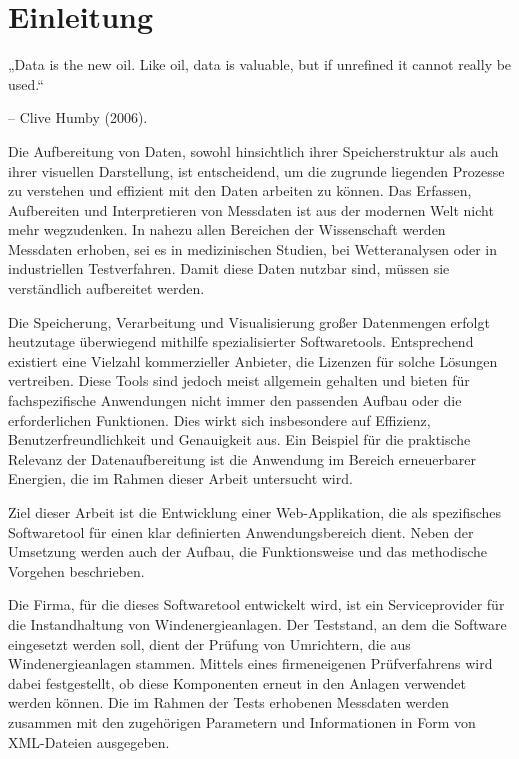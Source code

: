 


\newpage
\section{Einleitung}
\label{sec:einleitung}






„Data is the new oil. Like oil, data is valuable, but if
unrefined it cannot really be used.“

– Clive Humby (2006).

Die Aufbereitung von Daten, sowohl hinsichtlich ihrer
Speicherstruktur als auch ihrer visuellen Darstellung, ist entscheidend, um die
zugrunde liegenden Prozesse zu verstehen und effizient mit den Daten arbeiten
zu können. Das Erfassen, Aufbereiten und Interpretieren von Messdaten ist aus
der modernen Welt nicht mehr wegzudenken. In nahezu allen Bereichen der
Wissenschaft werden Messdaten erhoben, sei es in medizinischen Studien, bei
Wetteranalysen oder in industriellen Testverfahren. Damit diese Daten nutzbar
sind, müssen sie verständlich aufbereitet werden.



Die Speicherung, Verarbeitung und Visualisierung großer
Datenmengen erfolgt heutzutage überwiegend mithilfe spezialisierter
Softwaretools. Entsprechend existiert eine Vielzahl kommerzieller Anbieter, die
Lizenzen für solche Lösungen vertreiben. Diese Tools sind jedoch meist
allgemein gehalten und bieten für fachspezifische Anwendungen nicht immer den
passenden Aufbau oder die erforderlichen Funktionen. Dies wirkt sich
insbesondere auf Effizienz, Benutzerfreundlichkeit und Genauigkeit aus. Ein
Beispiel für die praktische Relevanz der Datenaufbereitung ist die Anwendung im
Bereich erneuerbarer Energien, die im Rahmen dieser Arbeit untersucht wird.



Ziel dieser Arbeit ist die Entwicklung einer
Web-Applikation, die als spezifisches Softwaretool für einen klar definierten
Anwendungsbereich dient. Neben der Umsetzung werden auch der Aufbau, die
Funktionsweise und das methodische Vorgehen beschrieben.



Die Firma, für die dieses Softwaretool entwickelt wird, ist
ein Serviceprovider für die Instandhaltung von Windenergieanlagen. Der
Teststand, an dem die Software eingesetzt werden soll, dient der Prüfung von
Umrichtern, die aus Windenergieanlagen stammen. Mittels eines firmeneigenen
Prüfverfahrens wird dabei festgestellt, ob diese Komponenten erneut in den
Anlagen verwendet werden können. Die im Rahmen der Tests erhobenen Messdaten
werden zusammen mit den zugehörigen Parametern und Informationen in Form von
XML-Dateien ausgegeben.



